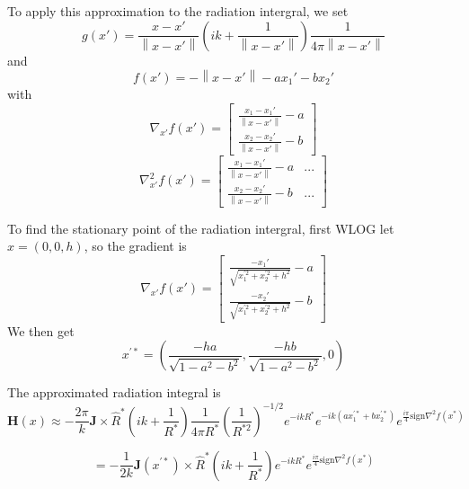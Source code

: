 \documentclass{article}
\newcommand{\norm}[1]{\left\lVert #1 \right\rVert}
\theoremstyle{plain}
\begin{document}
To apply this approximation to the radiation intergral,
we set
\begin{equation}
	g(x') = 
	\frac{x-x'}{\norm{x-x'}}
	\left( ik + \frac{1}{\norm{x-x'}} \right)
	\frac{1}{4\pi\norm{x-x'}}
\end{equation}
and
\begin{equation}
	f(x') = -\norm{x-x'} - ax_1' - bx_2'
\end{equation}
with
\begin{equation}
	\nabla_{x'} f(x') =
	\begin{bmatrix}
		\frac{x_1 - x_1'}{\norm{x-x'}} - a \\
		\frac{x_2 - x_2'}{\norm{x-x'}} - b
	\end{bmatrix}
\end{equation}
\begin{equation} %
	\nabla^2_{x'} f(x') =
	\begin{bmatrix}
		\frac{x_1 - x_1'}{\norm{x-x'}} - a & ... \\
		\frac{x_2 - x_2'}{\norm{x-x'}} - b & ...
	\end{bmatrix}
\end{equation}

To find the stationary point of the radiation intergral, first WLOG let $x=(0,0,h)$,
so the gradient is
\begin{equation}
	\nabla_{x'} f(x') = 
	\begin{bmatrix}
		\frac{-x_1'}{\sqrt{x_1^{'2} + x_2^{'2} + h^2}} - a \\
		\frac{-x_2'}{\sqrt{x_1^{'2} + x_2^{'2} + h^2}} - b
	\end{bmatrix}
\end{equation} %
We then get
\begin{equation}
	x^{'*} = \left( \frac{-ha}{\sqrt{ 1 - a^2 - b^2 }}, \frac{-hb}{\sqrt{ 1 - a^2 - b^2 }}, 0 \right)
\end{equation}


The approximated radiation integral is
\begin{equation} %
	\mathbf{H}(x) \approx
	-\frac{2\pi}{k}
	\mathbf{J} \times \hat{R}^*
	\left( ik + \frac{1}{R^*} \right)
	\frac{1}{4\pi R^*}
	\left( \frac{1}{R^{*2}} \right)^{-1/2}
	e^{-ikR^*}
	e^{-ik(ax_1^{'*} + bx_2^{'*})}
	e^{\frac{i\pi}{4}\text{sign}\nabla^2 f(x^*)}
\end{equation}

\begin{equation} %
	=
	-\frac{1}{2k}
	\mathbf{J}(x^{'*}) \times \hat{R}^*
	\left( ik + \frac{1}{R^*} \right)
	e^{-ikR^*}
	e^{\frac{i\pi}{4}\text{sign}\nabla^2 f(x^*)}
\end{equation}
\end{document}
